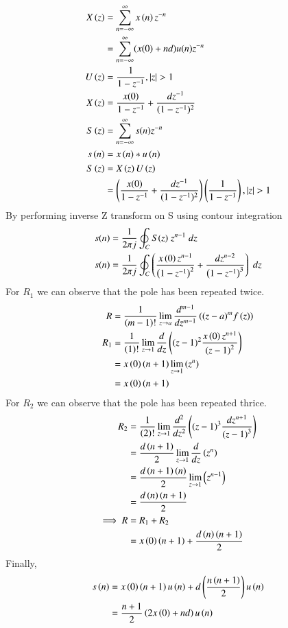 \documentclass[journal,12pt,twocolumn]{IEEEtran}
\theoremstyle{remark}
\begin{document}
\begin{align}
    X \brak{z} &= \sum_{n=-\infty}^{\infty} x \brak{n}   z^{-n}\\
     & = \sum_{n=-\infty}^{\infty}(x(0)+nd)u(n)z^{-n}\\
    U \brak{z} &= \frac{1}{1-z^{-1}},  |z|>1\\
    X \brak{z} & = \frac{x(0)}{1-z^{-1}} + \frac{dz^{-1}}{(1-z^{-1})^{2}}\\
    S\brak{z} &= \sum_{n=-\infty}^{\infty}s(n)z^{-n}\\
    s\brak{n} &= x\brak{n} \ast u\brak{n}\\
    S\brak{z} &= X\brak{z}U\brak{z}\\
     &= \brak{\frac{x(0)}{1-z^{-1}} + \frac{dz^{-1}}{(1-z^{-1})^{2}}}\brak{\frac{1}{1-z^{-1}}}, |z|>1
\end{align}
By performing inverse Z transform on S using contour integration
\begin{align}
   s(n)&=\frac{1}{2\pi j}\oint_{C}S(z) \;z^{n-1} \;dz  \\
   s(n)&=\frac{1}{2\pi j}\oint_{C}\left(\dfrac{x\left(0\right)z^{n-1}}{\left(1-z^{-1}\right)^2} + \dfrac{dz^{n-2}}{\left(1-z^{-1}\right)^{3}}\right)\;dz  
\end{align}
For $R_1$ we can observe that the pole has been repeated twice.
\begin{align}
    R&=\frac{1}{\left(m-1\right)!}\lim\limits_{z\to a}\frac{d^{m-1}}{dz^{m-1}}\left({(z-a)}^{m}f\left(z\right)\right)\\
    R_1&=\frac{1}{\left(1\right)!}\lim\limits_{z\to 1}\frac{d}{dz}\left({(z-1)}^{2}\frac{x\left(0\right)z^{n+1}}{{(z-1)}^2}\right)\\
    &=x\left(0\right)\left(n+1\right)\lim\limits_{z\to 1}\left(z^n\right)\\
    &=x\left(0\right)\left(n+1\right)
\end{align}
For $R_2$ we can observe that the pole has been repeated thrice.
\begin{align}
    R_2&=\frac{1}{\left(2\right)!}\lim\limits_{z\to 1}\frac{d^{2}}{dz^{2}}\left({(z-1)}^{3}\frac{dz^{n+1}}{{(z-1)}^3}\right)\\
    &=\frac{d\left(n+1\right)}{2}\lim\limits_{z\to 1}\frac{d}{dz}\left(z^n\right)\\
    &=\frac{d\left(n+1\right)\left(n\right)}{2}\lim\limits_{z\to 1}\left(z^{n-1}\right)\\
    &=\frac{d\left(n\right)\left(n+1\right)}{2}\\
    \implies R&= R_1 + R_2\\
    &=x\left(0\right)\left(n+1\right)+\frac{d\left(n\right)\left(n+1\right)}{2}
\end{align}
Finally,
\begin{align}
    s\left(n\right)&=x\left(0\right)\left(n+1\right)u\left(n\right)+d\left(\dfrac{{n\left(n+1\right)}}{2}\right)u\left(n\right)\\
    &=\dfrac{n+1}{2}\left(2x\left(0\right)+nd\right)u\left(n\right)
\end{align}
\end{document}
